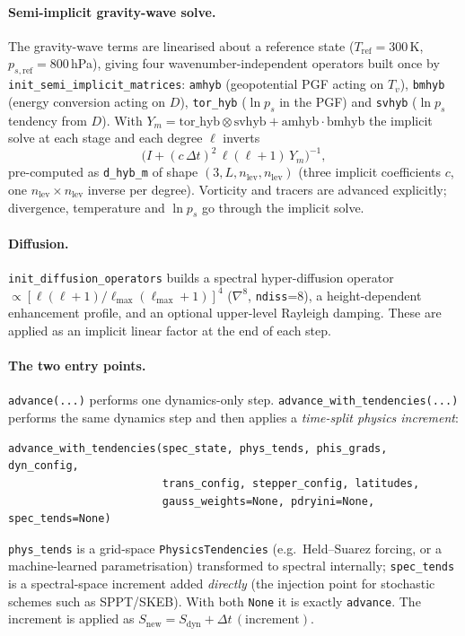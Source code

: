 \documentclass[11pt]{article}
\newcommand{\code}[1]{\texttt{#1}}
\begin{document}
\paragraph{Semi-implicit gravity-wave solve.} The gravity-wave terms are linearised
about a reference state ($T_{\text{ref}}=300$\,K, $p_{s,\text{ref}}=800$\,hPa),
giving four wavenumber-independent operators built once by
\code{init\_semi\_implicit\_matrices}: \code{amhyb} (geopotential PGF acting on
$T_v$), \code{bmhyb} (energy conversion acting on $D$), \code{tor\_hyb} ($\ln p_s$
in the PGF) and \code{svhyb} ($\ln p_s$ tendency from $D$). With
$Y_m=\text{tor\_hyb}\otimes\text{svhyb}+\text{amhyb}\cdot\text{bmhyb}$ the implicit
solve at each stage and each degree $\ell$ inverts
\begin{equation}
  \bigl(I + (c\,\Delta t)^2\,\ell(\ell+1)\,Y_m\bigr)^{-1},
\end{equation}
pre-computed as \code{d\_hyb\_m} of shape $(3, L, n_{\text{lev}}, n_{\text{lev}})$
(three implicit coefficients $c$, one $n_{\text{lev}}\times n_{\text{lev}}$
inverse per degree). Vorticity and tracers are advanced explicitly; divergence,
temperature and $\ln p_s$ go through the implicit solve.

\paragraph{Diffusion.} \code{init\_diffusion\_operators} builds a spectral
hyper-diffusion operator $\propto[\ell(\ell+1)/\ell_{\max}(\ell_{\max}+1)]^{4}$
($\nabla^8$, \code{ndiss}=8), a height-dependent enhancement profile, and an
optional upper-level Rayleigh damping. These are applied as an implicit linear
factor at the end of each step.

\paragraph{The two entry points.} \code{advance(...)} performs one dynamics-only
step. \code{advance\_with\_tendencies(...)} performs the same dynamics step and
then applies a \emph{time-split physics increment}:
\begin{lstlisting}
advance_with_tendencies(spec_state, phys_tends, phis_grads, dyn_config,
                        trans_config, stepper_config, latitudes,
                        gauss_weights=None, pdryini=None, spec_tends=None)
\end{lstlisting}
\code{phys\_tends} is a grid-space \code{PhysicsTendencies} (e.g.\ Held--Suarez
forcing, or a machine-learned parametrisation) transformed to spectral internally;
\code{spec\_tends} is a spectral-space increment added \emph{directly} (the
injection point for stochastic schemes such as SPPT/SKEB). With both \code{None}
it is exactly \code{advance}. The increment is applied as
$S_{\text{new}} = S_{\text{dyn}} + \Delta t\,(\text{increment})$.
\end{document}
